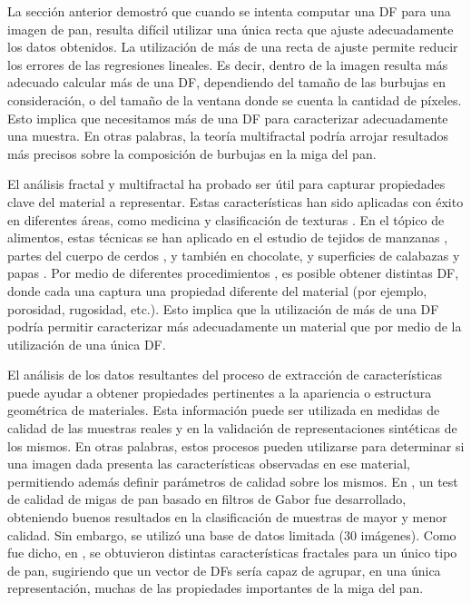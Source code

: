 La sección anterior demostró que cuando se intenta computar una DF para una imagen de pan, resulta difícil utilizar una única recta que ajuste adecuadamente los datos obtenidos.
La utilización de más de una recta de ajuste permite reducir los errores de las regresiones lineales.
Es decir, dentro de la imagen resulta más adecuado calcular más de una DF, dependiendo del tamaño de las burbujas en consideración, o del tamaño de la ventana donde se cuenta la cantidad de píxeles.
Esto implica que necesitamos más de una DF para caracterizar adecuadamente una muestra.
En otras palabras, la teoría multifractal podría arrojar resultados más precisos sobre la composición de burbujas en la miga del pan.

El análisis fractal y multifractal ha probado ser útil para capturar propiedades clave del material a representar.
Estas características han sido aplicadas con éxito en diferentes áreas, como medicina \cite{Andjelkovic2008,Yu2011} y clasificación de texturas \cite{Wendt2009}.
En el tópico de alimentos, estas técnicas se han aplicado en el estudio de tejidos de manzanas \cite{Mendoza2010}, partes del cuerpo de cerdos \cite{Serrano2012}, y también en chocolate, y superficies de calabazas y papas \cite{Quevedo2002}.
Por medio de diferentes procedimientos \cite{Gonzales2008,Peitgen2004}, es posible obtener distintas DF, donde cada una captura una propiedad diferente del material (por ejemplo, porosidad, rugosidad, etc.).
Esto implica que la utilización de más de una DF podría permitir caracterizar más adecuadamente un material que por medio de la utilización de una única DF.

El análisis de los datos resultantes del proceso de extracción de características puede ayudar a obtener propiedades pertinentes a la apariencia o estructura geométrica de materiales.
Esta información puede ser utilizada en medidas de calidad de las muestras reales y en la validación de representaciones sintéticas de los mismos.
En otras palabras, estos procesos pueden utilizarse para determinar si una imagen dada presenta las características observadas en ese material, permitiendo además definir parámetros de calidad sobre los mismos.
En \cite{Fan2006}, un test de calidad de migas de pan basado en filtros de Gabor fue desarrollado, obteniendo buenos resultados en la clasificación de muestras de mayor y menor calidad.
Sin embargo, se utilizó una base de datos limitada ($30$ imágenes).
Como fue dicho, en \cite{Gonzales2008}, se obtuvieron distintas características fractales para un único tipo de pan, sugiriendo que un vector de DFs sería capaz de agrupar, en una única representación, muchas de las propiedades importantes de la miga del pan.

